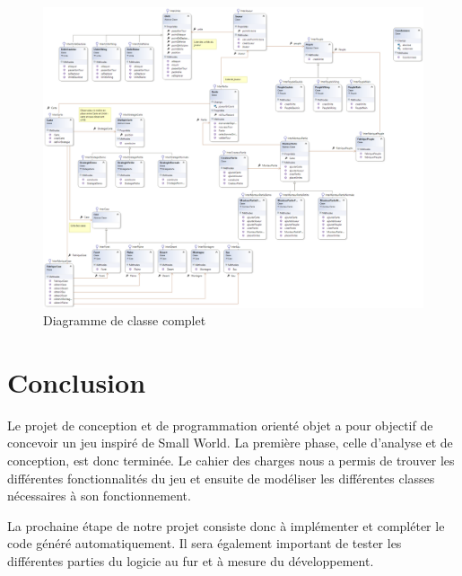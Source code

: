 \documentclass[a4paper]{article}%
\begin{document}
\begin{figure}[H]
    \centering
    \includegraphics[width=\textwidth,  angle=90]{./images/classe/global.png}
		\caption{Diagramme de classe complet}
		\label{fig:class_global}
\end{figure}


\newpage

\section*{Conclusion}

Le projet de conception et de programmation orienté objet a pour objectif de concevoir un jeu inspiré de Small World.
La première phase, celle d'analyse et de conception, est donc terminée.  Le cahier des charges nous a permis de trouver les différentes fonctionnalités du jeu et ensuite de modéliser les différentes classes nécessaires à son fonctionnement.

\medskip

La prochaine étape de notre projet consiste donc à implémenter et compléter le code généré automatiquement. Il sera également important de tester les différentes parties du logicie au fur et à mesure  du développement.


\newpage
\listoffigures
\end{document}
